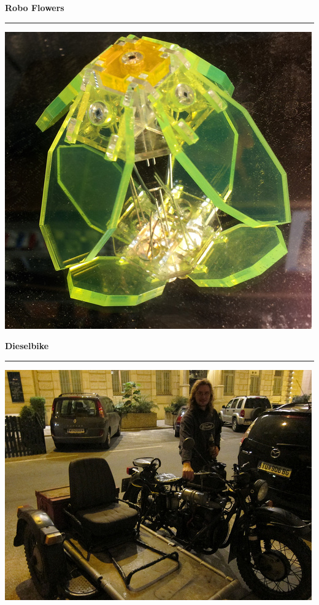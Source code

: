 \documentclass{seminar}
\providecommand{\T}[1]{
	\begin{center}
		{\bf #1}
	\end{center}
	\vspace{2mm}
	\hrule
	\vspace{2mm}
}
\begin{document}
\begin{slide}
	\T{Robo Flowers}
	\begin{center}
		\includegraphics[scale=0.4]{roboflower.jpeg}
	\end{center}
\end{slide}

\begin{slide}
	\T{Dieselbike}
	\begin{center}
		\includegraphics[scale=0.5]{dieselbike.jpeg}
	\end{center}
\end{slide}
\end{document}
